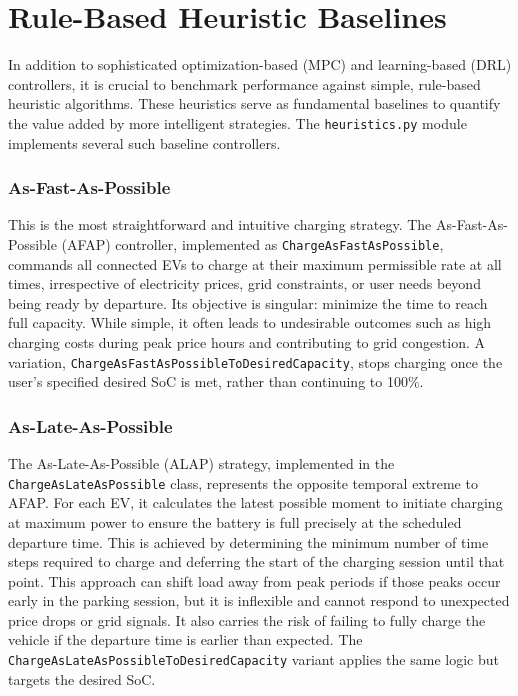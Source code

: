 \section{Rule-Based Heuristic Baselines}
\label{sec:heuristic_baselines}
\noindent
In addition to sophisticated optimization-based (MPC) and learning-based (DRL) controllers, it is crucial to benchmark performance against simple, rule-based heuristic algorithms. These heuristics serve as fundamental baselines to quantify the value added by more intelligent strategies. The \texttt{heuristics.py} module implements several such baseline controllers.

\subsubsection{As-Fast-As-Possible}
This is the most straightforward and intuitive charging strategy. The As-Fast-As-Possible (AFAP) controller, implemented as \texttt{ChargeAsFastAsPossible}, commands all connected EVs to charge at their maximum permissible rate at all times, irrespective of electricity prices, grid constraints, or user needs beyond being ready by departure. Its objective is singular: minimize the time to reach full capacity. While simple, it often leads to undesirable outcomes such as high charging costs during peak price hours and contributing to grid congestion. A variation, \texttt{ChargeAsFastAsPossibleToDesiredCapacity}, stops charging once the user's specified desired SoC is met, rather than continuing to 100\%.

\subsubsection{As-Late-As-Possible}
The As-Late-As-Possible (ALAP) strategy, implemented in the \texttt{ChargeAsLateAsPossible} class, represents the opposite temporal extreme to AFAP. For each EV, it calculates the latest possible moment to initiate charging at maximum power to ensure the battery is full precisely at the scheduled departure time. This is achieved by determining the minimum number of time steps required to charge and deferring the start of the charging session until that point. This approach can shift load away from peak periods if those peaks occur early in the parking session, but it is inflexible and cannot respond to unexpected price drops or grid signals. It also carries the risk of failing to fully charge the vehicle if the departure time is earlier than expected. The \texttt{ChargeAsLateAsPossibleToDesiredCapacity} variant applies the same logic but targets the desired SoC.

